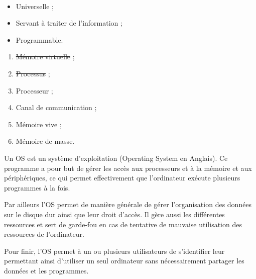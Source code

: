 \exer{[ARCHI-004]}
\setcounter{numques}{0}~\\

\begin{minipage}{0.5\textwidth}
\question{}

\begin{itemize}
\item Universelle ; 
\item Servant à traiter de l'information ;
\item Programmable.
\end{itemize}
\end{minipage}
\begin{minipage}{0.5\textwidth}
\question{}

\begin{enumerate}[label=(\alph*)]
\item \sout{Mémoire virtuelle} ;
\item \sout{Processus} ;
\item Processeur ;
\item Canal de communication ;
\item Mémoire vive ;
\item Mémoire de masse.
\end{enumerate}
\end{minipage}





\question{}

Un OS est un système d'exploitation (Operating System en Anglais). 
Ce programme a pour but de gérer les accès aux processeurs et à la mémoire et aux périphériques, ce qui permet effectivement que l'ordinateur exécute plusieurs programmes à la fois.

Par ailleurs l'OS permet de manière générale de gérer l'organisation des données sur le disque dur ainsi que leur droit d'accès. Il gère aussi les différentes ressources et sert de garde-fou en cas de tentative de mauvaise utilisation des ressources de l'ordinateur.

Pour finir, l'OS permet à un ou plusieurs utilisateurs de s'identifier leur permettant ainsi d'utiliser un seul ordinateur sans nécessairement partager les données et les programmes. 